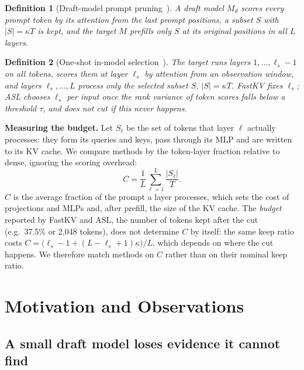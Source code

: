 \documentclass[10pt,conference]{IEEEtran}
\newtheorem{definition}{Definition}
\begin{document}
\begin{definition}[Draft-model prompt pruning~\cite{liu2025specprefill}]
A draft model $M_d$ scores every prompt token by its attention from the last prompt positions, a subset $S$ with $|S|=\kappa T$ is kept, and the target $M$ prefills only $S$ at its original positions in all $L$ layers.
\end{definition}

\begin{definition}[One-shot in-model selection~\cite{jo2026fastkv,taniguchi2026asl}]
The target runs layers $1,\dots,\ell_s-1$ on all tokens, scores them at layer $\ell_s$ by attention from an observation window, and layers $\ell_s,\dots,L$ process only the selected subset $S$, $|S|=\kappa T$. FastKV fixes $\ell_s$; ASL chooses $\ell_s$ per input once the rank variance of token scores falls below a threshold $\tau$, and does not cut if this never happens.
\end{definition}

\textbf{Measuring the budget.} Let $S_\ell$ be the set of tokens that layer $\ell$ actually processes: they form its queries and keys, pass through its MLP and are written to its KV cache. We compare methods by the token-layer fraction relative to dense, ignoring the scoring overhead:
\begin{equation}
C=\frac{1}{L}\sum_{\ell=1}^{L}\frac{|S_\ell|}{T}.
\label{eq:budget}
\end{equation}
$C$ is the average fraction of the prompt a layer processes, which sets the cost of projections and MLPs and, after prefill, the size of the KV cache. The \emph{budget} reported by FastKV and ASL, the number of tokens kept after the cut (e.g.\ 37.5\% or 2{,}048 tokens), does not determine $C$ by itself: the same keep ratio costs $C=\big(\ell_s-1+(L-\ell_s+1)\kappa\big)/L$, which depends on where the cut happens. We therefore match methods on $C$ rather than on their nominal keep ratio.

\section{Motivation and Observations}
\label{sec:motivation}

\subsection{A small draft model loses evidence it cannot find}
\label{sec:obs-draft}
\end{document}
